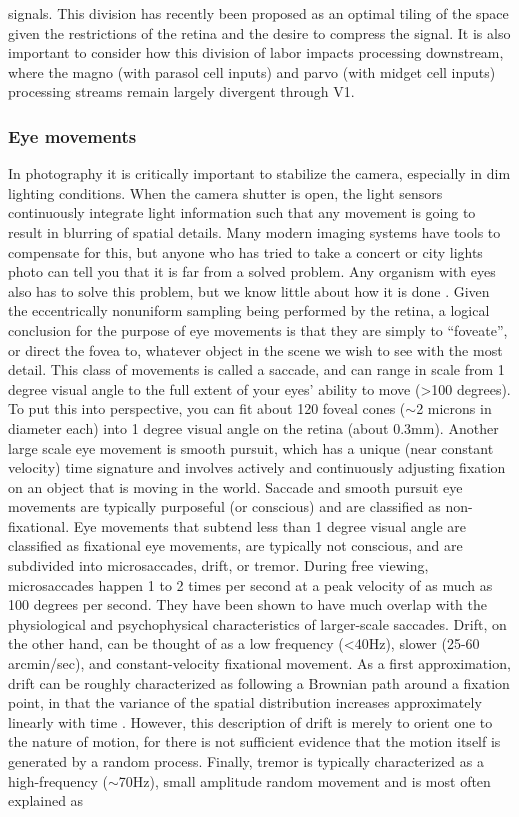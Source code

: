 signals. This division has recently been proposed as an optimal tiling of the space given the restrictions of the retina \parencite{mcintosh2016deep} and the desire to compress the signal. It is also important to consider how this division of labor impacts processing downstream, where the magno (with parasol cell inputs) and parvo (with midget cell inputs) processing streams remain largely divergent through V1.

\subsubsection{Eye movements}
In photography it is critically important to stabilize the camera, especially in dim lighting conditions. When the camera shutter is open, the light sensors continuously integrate light information such that any movement is going to result in blurring of spatial details. Many modern imaging systems have tools to compensate for this, but anyone who has tried to take a concert or city lights photo can tell you that it is far from a solved problem. Any organism with eyes also has to solve this problem, but we know little about how it is done \parencite{olshausen2010does, burak2010bayesian}. Given the eccentrically nonuniform sampling being performed by the retina, a logical conclusion for the purpose of eye movements is that they are simply to ``foveate'', or direct the fovea to, whatever object in the scene we wish to see with the most detail. This class of movements is called a saccade, and can range in scale from 1 degree visual angle to the full extent of your eyes’ ability to move (\textgreater 100 degrees). To put this into perspective, you can fit about 120 foveal cones ($\sim$2 microns in diameter each) into 1 degree visual angle on the retina (about 0.3mm). Another large scale eye movement is smooth pursuit, which has a unique (near constant velocity) time signature and involves actively and continuously adjusting fixation on an object that is moving in the world. Saccade and smooth pursuit eye movements are typically purposeful (or conscious) and are classified as non-fixational. Eye movements that subtend less than 1 degree visual angle are classified as fixational eye movements, are typically not conscious, and are subdivided into microsaccades, drift, or tremor. During free viewing, microsaccades happen 1 to 2  times per second at a peak velocity of as much as 100 degrees per second. They have been shown to have much overlap with the physiological and psychophysical characteristics of larger-scale saccades. Drift, on the other hand, can be thought of as a low frequency (\textless 40Hz), slower (25-60 arcmin/sec), and constant-velocity fixational movement. As a first approximation, drift can be roughly characterized as following a Brownian path around a fixation point, in that the variance of the spatial distribution increases approximately linearly with time \parencite{rucci2015unsteady}. However, this description of drift is merely to orient one to the nature of motion, for there is not sufficient evidence that the motion itself is generated by a random process. Finally, tremor is typically characterized as a high-frequency ($\sim$70Hz), small amplitude random movement and is most often explained as 